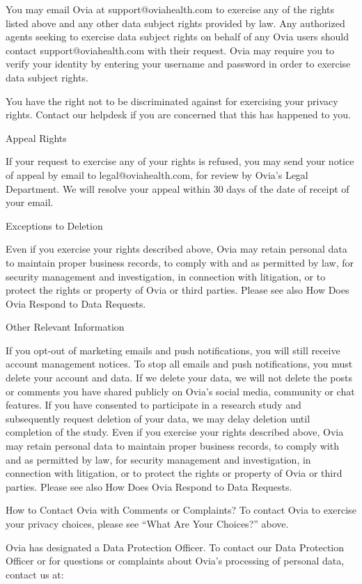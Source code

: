 You may email Ovia at support@oviahealth.com to exercise any of the rights listed above and any other data subject rights provided by law. Any authorized agents seeking to exercise data subject rights on behalf of any Ovia users should contact support@oviahealth.com with their request. Ovia may require you to verify your identity by entering your username and password in order to exercise data subject rights.

You have the right not to be discriminated against for exercising your privacy rights. Contact our helpdesk if you are concerned that this has happened to you.

Appeal Rights

If your request to exercise any of your rights is refused, you may send your notice of appeal by email to legal@oviahealth.com, for review by Ovia’s Legal Department. We will resolve your appeal within 30 days of the date of receipt of your email.

Exceptions to Deletion

Even if you exercise your rights described above, Ovia may retain personal data to maintain proper business records, to comply with and as permitted by law, for security management and investigation, in connection with litigation, or to protect the rights or property of Ovia or third parties. Please see also How Does Ovia Respond to Data Requests.

Other Relevant Information

If you opt-out of marketing emails and push notifications, you will still receive account management notices. To stop all emails and push notifications, you must delete your account and data. If we delete your data, we will not delete the posts or comments you have shared publicly on Ovia’s social media, community or chat features. If you have consented to participate in a research study and subsequently request deletion of your data, we may delay deletion until completion of the study. Even if you exercise your rights described above, Ovia may retain personal data to maintain proper business records, to comply with and as permitted by law, for security management and investigation, in connection with litigation, or to protect the rights or property of Ovia or third parties. Please see also How Does Ovia Respond to Data Requests.

How to Contact Ovia with Comments or Complaints?
To contact Ovia to exercise your privacy choices, please see “What Are Your Choices?” above.

Ovia has designated a Data Protection Officer. To contact our Data Protection Officer or for questions or complaints about Ovia’s processing of personal data, contact us at:

